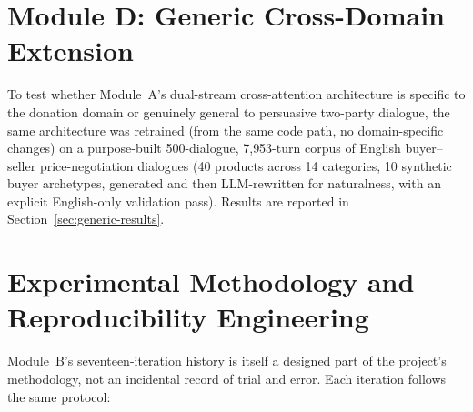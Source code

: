 \section{Module D: Generic Cross-Domain Extension}
\label{sec:design-module-d}

To test whether Module~A's dual-stream cross-attention architecture is
specific to the donation domain or genuinely general to persuasive
two-party dialogue, the same architecture was retrained (from the same code
path, no domain-specific changes) on a purpose-built 500-dialogue,
7{,}953-turn corpus of English buyer--seller price-negotiation dialogues
(40 products across 14 categories, 10 synthetic buyer archetypes, generated
and then LLM-rewritten for naturalness, with an explicit English-only
validation pass). Results are reported in Section~\ref{sec:generic-results}.

\section{Experimental Methodology and Reproducibility Engineering}
\label{sec:design-methodology}

Module~B's seventeen-iteration history is itself a designed part of the
project's methodology, not an incidental record of trial and error. Each
iteration follows the same protocol:

